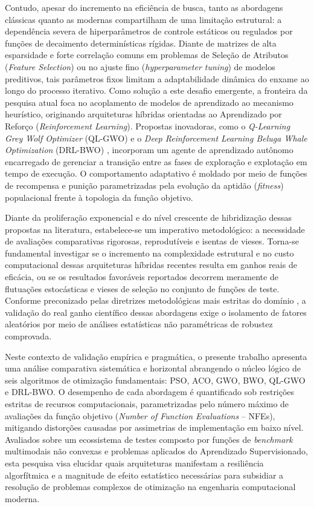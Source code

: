 \documentclass[12pt, a4paper, oneside]{report}
\begin{document}
Contudo, apesar do incremento na eficiência de busca, tanto as abordagens clássicas quanto as modernas compartilham de uma limitação estrutural: a dependência severa de hiperparâmetros de controle estáticos ou regulados por funções de decaimento determinísticas rígidas. Diante de matrizes de alta esparsidade e forte correlação comuns em problemas de Seleção de Atributos (\textit{Feature Selection}) ou no ajuste fino (\textit{hyperparameter tuning}) de modelos preditivos, tais parâmetros fixos limitam a adaptabilidade dinâmica do enxame ao longo do processo iterativo. Como solução a este desafio emergente, a fronteira da pesquisa atual foca no acoplamento de modelos de aprendizado ao mecanismo heurístico, originando arquiteturas híbridas orientadas ao Aprendizado por Reforço (\textit{Reinforcement Learning}). Propostas inovadoras, como o \textit{Q-Learning Grey Wolf Optimizer} (QL-GWO) \citep{tu2024qlearning} e o \textit{Deep Reinforcement Learning Beluga Whale Optimization} (DRL-BWO) \citep{praveena2022optimal}, incorporam um agente de aprendizado autônomo encarregado de gerenciar a transição entre as fases de exploração e explotação em tempo de execução. O comportamento adaptativo é moldado por meio de funções de recompensa e punição parametrizadas pela evolução da aptidão (\textit{fitness}) populacional frente à topologia da função objetivo.

Diante da proliferação exponencial e do nível crescente de hibridização dessas propostas na literatura, estabelece-se um imperativo metodológico: a necessidade de avaliações comparativas rigorosas, reprodutíveis e isentas de vieses. Torna-se fundamental investigar se o incremento na complexidade estrutural e no custo computacional dessas arquiteturas híbridas recentes resulta em ganhos reais de eficácia, ou se os resultados favoráveis reportados decorrem meramente de flutuações estocásticas e vieses de seleção no conjunto de funções de teste. Conforme preconizado pelas diretrizes metodológicas mais estritas do domínio \citep{huang2023evaluation, ismail2026beyond}, a validação do real ganho científico dessas abordagens exige o isolamento de fatores aleatórios por meio de análises estatísticas não paramétricas de robustez comprovada.

Neste contexto de validação empírica e pragmática, o presente trabalho apresenta uma análise comparativa sistemática e horizontal abrangendo o núcleo lógico de seis algoritmos de otimização fundamentais: PSO, ACO, GWO, BWO, QL-GWO e DRL-BWO. O desempenho de cada abordagem é quantificado sob restrições estritas de recursos computacionais, parametrizadas pelo número máximo de avaliações da função objetivo (\textit{Number of Function Evaluations} -- NFEs), mitigando distorções causadas por assimetrias de implementação em baixo nível. Avaliados sobre um ecossistema de testes composto por funções de \textit{benchmark} multimodais não convexas e problemas aplicados do Aprendizado Supervisionado, esta pesquisa visa elucidar quais arquiteturas manifestam a resiliência algorfítmica e a magnitude de efeito estatístico necessárias para subsidiar a resolução de problemas complexos de otimização na engenharia computacional moderna.
\end{document}
